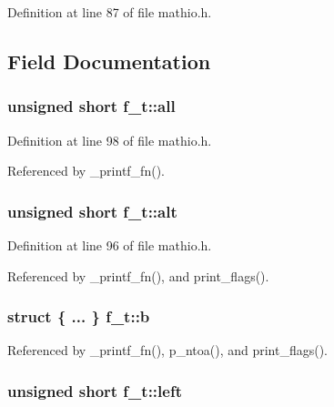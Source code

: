 Definition at line 87 of file mathio.\+h.



\subsection{Field Documentation}
\subsubsection[{\texorpdfstring{all}{all}}]{\setlength{\rightskip}{0pt plus 5cm}unsigned short f\+\_\+t\+::all}\hypertarget{unionf__t_aab0615c9ada80b0f986b58639ea8c480}{}\label{unionf__t_aab0615c9ada80b0f986b58639ea8c480}


Definition at line 98 of file mathio.\+h.



Referenced by \+\_\+printf\+\_\+fn().

\subsubsection[{\texorpdfstring{alt}{alt}}]{\setlength{\rightskip}{0pt plus 5cm}unsigned short f\+\_\+t\+::alt}\hypertarget{unionf__t_a907a8d8af4803c9a18bc0586d22d6881}{}\label{unionf__t_a907a8d8af4803c9a18bc0586d22d6881}


Definition at line 96 of file mathio.\+h.



Referenced by \+\_\+printf\+\_\+fn(), and print\+\_\+flags().

\subsubsection[{\texorpdfstring{b}{b}}]{\setlength{\rightskip}{0pt plus 5cm}struct \{ ... \}   f\+\_\+t\+::b}\hypertarget{unionf__t_a6ceb214475d9cd64026a8457abcf6269}{}\label{unionf__t_a6ceb214475d9cd64026a8457abcf6269}


Referenced by \+\_\+printf\+\_\+fn(), p\+\_\+ntoa(), and print\+\_\+flags().

\subsubsection[{\texorpdfstring{left}{left}}]{\setlength{\rightskip}{0pt plus 5cm}unsigned short f\+\_\+t\+::left}\hypertarget{unionf__t_a5f89cd6194ccc6a288f1fe31d39b2e64}{}\label{unionf__t_a5f89cd6194ccc6a288f1fe31d39b2e64}


